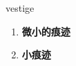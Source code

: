 
\begin{frame}
{\huge vestige}
\begin{center}
\begin{enumerate}\Large
  \item \textbf{微小的痕迹}
  \item \textbf{小痕迹}
\end{enumerate}
\end{center}
\end{frame}
